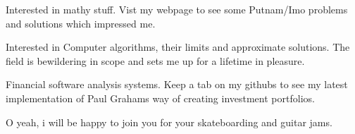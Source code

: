 

\begin{cventries}

  \cventryOnlyDescription
    {
      \begin{cvitems} %
        \item {Interested in mathy stuff. Vist my webpage to see some Putnam/Imo problems and solutions which impressed me.}
        \item {Interested in Computer algorithms, their limits and approximate solutions. The field is bewildering in scope and sets me up for a lifetime in pleasure.}
        \item {Financial software analysis systems. Keep a tab on my githubs to see my latest implementation of Paul Grahams way of creating investment portfolios.}
	\item {O yeah, i will be happy to join you for your skateboarding and guitar jams.}
      \end{cvitems}
    }

\end{cventries}

